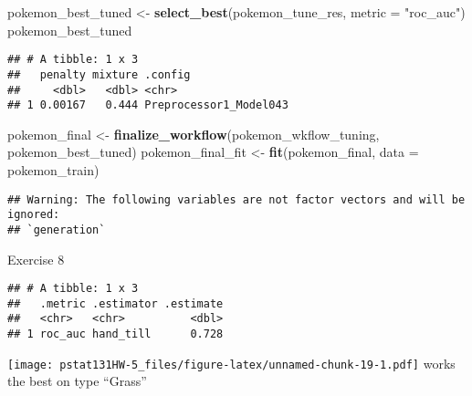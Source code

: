 \documentclass[]{article}
\newenvironment{Shaded}{\begin{snugshade}}{\end{snugshade}}
\newcommand{\DataTypeTok}[1]{\textcolor[rgb]{0.13,0.29,0.53}{#1}}
\newcommand{\DecValTok}[1]{\textcolor[rgb]{0.00,0.00,0.81}{#1}}
\newcommand{\KeywordTok}[1]{\textcolor[rgb]{0.13,0.29,0.53}{\textbf{#1}}}
\newcommand{\NormalTok}[1]{#1}
\newcommand{\OperatorTok}[1]{\textcolor[rgb]{0.81,0.36,0.00}{\textbf{#1}}}
\newcommand{\StringTok}[1]{\textcolor[rgb]{0.31,0.60,0.02}{#1}}
\begin{document}
\begin{Shaded}
\begin{Highlighting}[]
\NormalTok{pokemon_best_tuned <-}\StringTok{ }\KeywordTok{select_best}\NormalTok{(pokemon_tune_res, }\DataTypeTok{metric =} \StringTok{"roc_auc"}\NormalTok{)}
\NormalTok{pokemon_best_tuned}
\end{Highlighting}
\end{Shaded}

\begin{verbatim}
## # A tibble: 1 x 3
##   penalty mixture .config               
##     <dbl>   <dbl> <chr>                 
## 1 0.00167   0.444 Preprocessor1_Model043
\end{verbatim}

\begin{Shaded}
\begin{Highlighting}[]
\NormalTok{pokemon_final <-}\StringTok{ }\KeywordTok{finalize_workflow}\NormalTok{(pokemon_wkflow_tuning, pokemon_best_tuned)}
\NormalTok{pokemon_final_fit <-}\StringTok{ }\KeywordTok{fit}\NormalTok{(pokemon_final, }\DataTypeTok{data =}\NormalTok{ pokemon_train)}
\end{Highlighting}
\end{Shaded}

\begin{verbatim}
## Warning: The following variables are not factor vectors and will be ignored:
## `generation`
\end{verbatim}

Exercise 8

\begin{Shaded}
\end{Shaded}

\begin{verbatim}
## # A tibble: 1 x 3
##   .metric .estimator .estimate
##   <chr>   <chr>          <dbl>
## 1 roc_auc hand_till      0.728
\end{verbatim}

\begin{Shaded}
\end{Shaded}

\texttt{[image: pstat131HW-5\_files/figure-latex/unnamed-chunk-19-1.pdf]}
works the best on type ``Grass''
\end{document}
